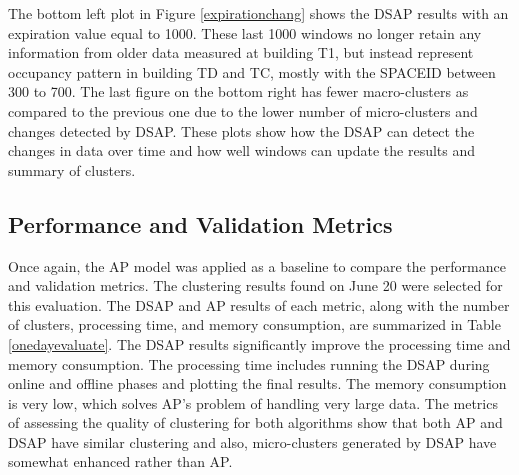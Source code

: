 The bottom left plot in Figure \ref{expirationchang} shows the DSAP results with an expiration value equal to 1000. These last 1000 windows no longer retain any information from older data measured at building T1, but instead represent occupancy pattern in building TD and TC, mostly with the SPACEID between 300 to 700. The last figure on the bottom right has fewer macro-clusters as compared to the previous one due to the lower number of micro-clusters and changes detected by DSAP. These plots show how the DSAP can detect the changes in data over time and how well windows can update the results and summary of clusters. 







\subsection{Performance and Validation Metrics}

Once again, the AP model was applied as a baseline to compare the performance and validation metrics. The clustering results found on June 20 were selected for this evaluation. 
The DSAP and AP results of each metric, along with the number of clusters, processing time, and memory consumption, are summarized in Table \ref{onedayevaluate}. The DSAP results significantly improve the processing time and memory consumption. The processing time includes running the DSAP during online and offline phases and plotting the final results.  The memory consumption is very low, which solves AP's problem of handling very large data. The metrics of assessing the quality of clustering for both algorithms show that both AP and DSAP have similar clustering and also, micro-clusters generated by DSAP have somewhat enhanced rather than AP.





